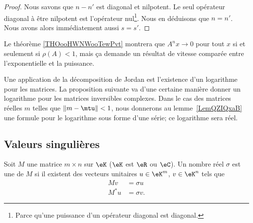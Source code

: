 \begin{proof}
    Nous savons que \( n-n'\) est diagonal et nilpotent. Le seul opérateur diagonal à être nilpotent est l'opérateur nul\footnote{Parce qu'une puissance d'un opérateur diagonal est diagonal.}. Nous en déduisons que \( n=n'\). Nous avons alors immédiatement aussi \( s=s'\).
\end{proof}

\begin{normaltext}
    Le théorème \ref{THOooHWNWooTewPvt} montrera que \( A^nx\to 0\) pour tout \( x\) si et seulement si \( \rho(A)<1\), mais ça demande un résultat de vitesse comparée entre l'exponentielle et la puissance.
\end{normaltext}

Une application de la décomposition de Jordan est l'existence d'un logarithme pour les matrices. La proposition suivante va d'une certaine manière donner un logarithme pour les matrices inversibles complexes. Dans le cas des matrices réelles \( m\) telles que \( \| m-\mtu \|<1\), nous donnerons au lemme~\ref{LemQZIQxaB} une formule pour le logarithme sous forme d'une série; ce logarithme sera réel.

\subsection{Valeurs singulières}

\begin{definition}
    Soit \( M\) une matrice \( m\times n\) sur \( \eK\) (\( \eK\) est \( \eR\) ou \( \eC\)). Un nombre réel \( \sigma\) est une  de \( M\) si il existent des vecteurs unitaires \( u\in \eK^m\), \( v\in \eK^n\) tels que
    \begin{subequations}
        \begin{align}
            Mv&=\sigma u\\
            M^*u&=\sigma v.
        \end{align}
    \end{subequations}
\end{definition}

